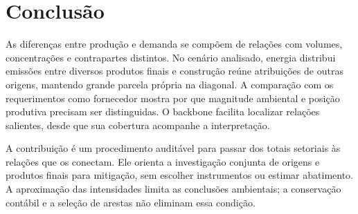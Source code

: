 \section{Conclusão}

As diferenças entre produção e demanda se compõem de relações com volumes, concentrações e contrapartes distintos. No cenário analisado, energia distribui emissões entre diversos produtos finais e construção reúne atribuições de outras origens, mantendo grande parcela própria na diagonal. A comparação com os requerimentos como fornecedor mostra por que magnitude ambiental e posição produtiva precisam ser distinguidas. O backbone facilita localizar relações salientes, desde que sua cobertura acompanhe a interpretação.

A contribuição é um procedimento auditável para passar dos totais setoriais às relações que os conectam. Ele orienta a investigação conjunta de origens e produtos finais para mitigação, sem escolher instrumentos ou estimar abatimento. A aproximação das intensidades limita as conclusões ambientais; a conservação contábil e a seleção de arestas não eliminam essa condição.
